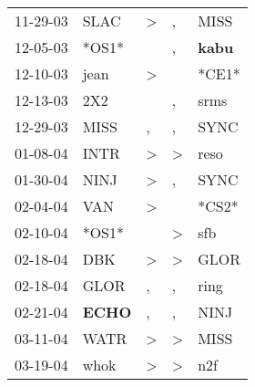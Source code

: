 \begin{supertabular}{p{0.07\textwidth}p{0.06\textwidth}p{0.02\textwidth}p{0.02\textwidth}p{0.06\textwidth}}
          11-29-03\textsuperscript{} &           SLAC\textsuperscript{} &     \textgreater &                , &           MISS\textsuperscript{} \\
          12-05-03\textsuperscript{} &                            *OS1* &                  &                , &  \textbf{kabu\textsuperscript{}} \\
          12-10-03\textsuperscript{} &           jean\textsuperscript{} &     \textgreater &                  &                            *CE1* \\
          12-13-03\textsuperscript{} &            2X2\textsuperscript{} &                  &                , &           srms\textsuperscript{} \\
          12-29-03\textsuperscript{} &           MISS\textsuperscript{} &                , &                , &           SYNC\textsuperscript{} \\
          01-08-04\textsuperscript{} &           INTR\textsuperscript{} &     \textgreater &     \textgreater &           reso\textsuperscript{} \\
          01-30-04\textsuperscript{} &           NINJ\textsuperscript{} &     \textgreater &                , &           SYNC\textsuperscript{} \\
          02-04-04\textsuperscript{} &            VAN\textsuperscript{} &     \textgreater &                  &                            *CS2* \\
          02-10-04\textsuperscript{} &                            *OS1* &                  &     \textgreater &            sfb\textsuperscript{} \\
          02-18-04\textsuperscript{} &            DBK\textsuperscript{} &     \textgreater &     \textgreater &           GLOR\textsuperscript{} \\
          02-18-04\textsuperscript{} &           GLOR\textsuperscript{} &                , &                , &           ring\textsuperscript{} \\
          02-21-04\textsuperscript{} &  \textbf{ECHO\textsuperscript{}} &                , &                , &           NINJ\textsuperscript{} \\
          03-11-04\textsuperscript{} &           WATR\textsuperscript{} &     \textgreater &     \textgreater &           MISS\textsuperscript{} \\
          03-19-04\textsuperscript{} &           whok\textsuperscript{} &     \textgreater &     \textgreater &            n2f\textsuperscript{} \\

\end{supertabular}
